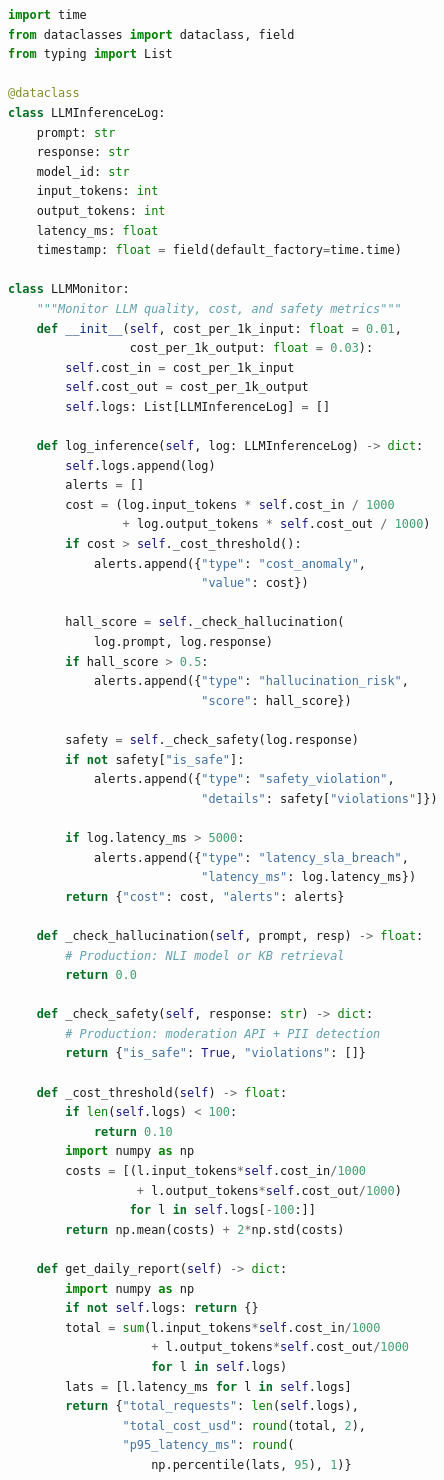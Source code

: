 \begin{lstlisting}[language=Python, caption={LLM Response Quality Monitor with Cost Tracking}, label={lst:llm_monitor}]
import time
from dataclasses import dataclass, field
from typing import List

@dataclass
class LLMInferenceLog:
    prompt: str
    response: str
    model_id: str
    input_tokens: int
    output_tokens: int
    latency_ms: float
    timestamp: float = field(default_factory=time.time)

class LLMMonitor:
    """Monitor LLM quality, cost, and safety metrics"""
    def __init__(self, cost_per_1k_input: float = 0.01,
                 cost_per_1k_output: float = 0.03):
        self.cost_in = cost_per_1k_input
        self.cost_out = cost_per_1k_output
        self.logs: List[LLMInferenceLog] = []

    def log_inference(self, log: LLMInferenceLog) -> dict:
        self.logs.append(log)
        alerts = []
        cost = (log.input_tokens * self.cost_in / 1000
                + log.output_tokens * self.cost_out / 1000)
        if cost > self._cost_threshold():
            alerts.append({"type": "cost_anomaly",
                           "value": cost})

        hall_score = self._check_hallucination(
            log.prompt, log.response)
        if hall_score > 0.5:
            alerts.append({"type": "hallucination_risk",
                           "score": hall_score})

        safety = self._check_safety(log.response)
        if not safety["is_safe"]:
            alerts.append({"type": "safety_violation",
                           "details": safety["violations"]})

        if log.latency_ms > 5000:
            alerts.append({"type": "latency_sla_breach",
                           "latency_ms": log.latency_ms})
        return {"cost": cost, "alerts": alerts}

    def _check_hallucination(self, prompt, resp) -> float:
        # Production: NLI model or KB retrieval
        return 0.0

    def _check_safety(self, response: str) -> dict:
        # Production: moderation API + PII detection
        return {"is_safe": True, "violations": []}

    def _cost_threshold(self) -> float:
        if len(self.logs) < 100:
            return 0.10
        import numpy as np
        costs = [(l.input_tokens*self.cost_in/1000
                  + l.output_tokens*self.cost_out/1000)
                 for l in self.logs[-100:]]
        return np.mean(costs) + 2*np.std(costs)

    def get_daily_report(self) -> dict:
        import numpy as np
        if not self.logs: return {}
        total = sum(l.input_tokens*self.cost_in/1000
                    + l.output_tokens*self.cost_out/1000
                    for l in self.logs)
        lats = [l.latency_ms for l in self.logs]
        return {"total_requests": len(self.logs),
                "total_cost_usd": round(total, 2),
                "p95_latency_ms": round(
                    np.percentile(lats, 95), 1)}
\end{lstlisting}

